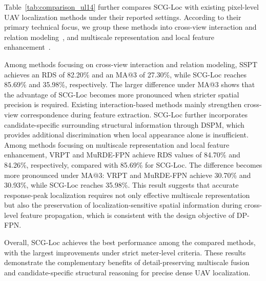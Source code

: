 \documentclass[runningheads]{llncs}
\begin{document}
Table~\ref{tab:comparison_ul14} further compares SCG-Loc with existing pixel-level UAV localization methods under their reported settings. According to their primary technical focus, we group these methods into cross-view interaction and relation modeling~\cite{chen2024osfpi,fan2024sspt,tian2025cmin}, and multiscale representation and local feature enhancement~\cite{wang2023wamf,he2024dcd,ju2025vrpt,kisieliute2026murde,ngo2025amcf}.

Among methods focusing on cross-view interaction and relation modeling, SSPT achieves an RDS of 82.20\% and an MA@3 of 27.30\%, while SCG-Loc reaches 85.69\% and 35.98\%, respectively. The larger difference under MA@3 shows that the advantage of SCG-Loc becomes more pronounced when stricter spatial precision is required. Existing interaction-based methods mainly strengthen cross-view correspondence during feature extraction. SCG-Loc further incorporates candidate-specific surrounding structural information through DSPM, which provides additional discrimination when local appearance alone is insufficient. Among methods focusing on multiscale representation and local feature enhancement, VRPT and MuRDE-FPN achieve RDS values of 84.70\% and 84.26\%, respectively, compared with 85.69\% for SCG-Loc. The difference becomes more pronounced under MA@3: VRPT and MuRDE-FPN achieve 30.70\% and 30.93\%, while SCG-Loc reaches 35.98\%. This result suggests that accurate response-peak localization requires not only effective multiscale representation but also the preservation of localization-sensitive spatial information during cross-level feature propagation, which is consistent with the design objective of DP-FPN.

Overall, SCG-Loc achieves the best performance among the compared methods, with the largest improvements under strict meter-level criteria. These results demonstrate the complementary benefits of detail-preserving multiscale fusion and candidate-specific structural reasoning for precise dense UAV localization.
\end{document}
